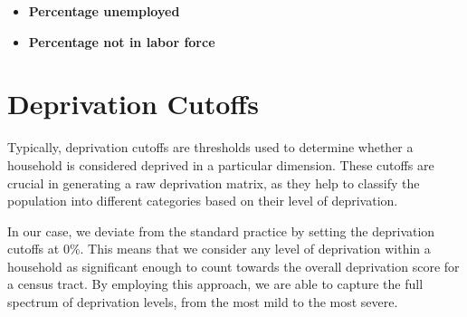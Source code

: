 \documentclass[
  letterpaper,
  DIV=11,
  numbers=noendperiod]{scrreprt}
\providecommand{\tightlist}{%
  \setlength{\itemsep}{0pt}\setlength{\parskip}{0pt}}\usepackage{longtable,booktabs,array}
\begin{document}
\begin{itemize}
\tightlist
\item
  \textbf{Percentage unemployed}
\item
  \textbf{Percentage not in labor force}
\end{itemize}

\section{Deprivation Cutoffs}\label{deprivation-cutoffs}

Typically, deprivation cutoffs are thresholds used to determine whether
a household is considered deprived in a particular dimension. These
cutoffs are crucial in generating a raw deprivation matrix, as they help
to classify the population into different categories based on their
level of deprivation.

In our case, we deviate from the standard practice by setting the
deprivation cutoffs at 0\%. This means that we consider any level of
deprivation within a household as significant enough to count towards
the overall deprivation score for a census tract. By employing this
approach, we are able to capture the full spectrum of deprivation
levels, from the most mild to the most severe.
\end{document}

